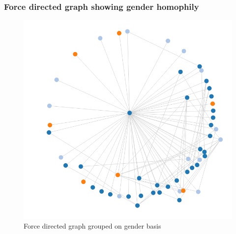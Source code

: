 \documentclass[12pt]{article}
\begin{document}
\subsubsection{Force directed graph showing gender homophily}
\begin{figure}[ht]
\includegraphics[scale=0.9]{../q2/gr2.png}
\centering
\caption{Force directed graph grouped on gender basis}
\label{Force directed graph showing gender homophily}
\end{figure}
\newpage
\end{document}
